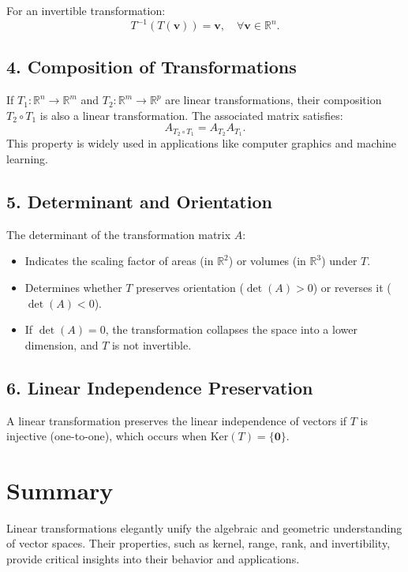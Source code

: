\documentclass[11pt]{article}
\begin{document}
For an invertible transformation:
\[
T^{-1}(T(\mathbf{v})) = \mathbf{v}, \quad \forall \mathbf{v} \in \mathbb{R}^n.
\]

\subsection*{4. Composition of Transformations}

If \( T_1: \mathbb{R}^n \to \mathbb{R}^m \) and \( T_2: \mathbb{R}^m \to \mathbb{R}^p \) are linear transformations, their composition \( T_2 \circ T_1 \) is also a linear transformation. The associated matrix satisfies:
\[
A_{T_2 \circ T_1} = A_{T_2} A_{T_1}.
\]
This property is widely used in applications like computer graphics and machine learning.

\subsection*{5. Determinant and Orientation}

The determinant of the transformation matrix \( A \):
\begin{itemize}
    \item Indicates the scaling factor of areas (in \( \mathbb{R}^2 \)) or volumes (in \( \mathbb{R}^3 \)) under \( T \).
    \item Determines whether \( T \) preserves orientation (\( \det(A) > 0 \)) or reverses it (\( \det(A) < 0 \)).
    \item If \( \det(A) = 0 \), the transformation collapses the space into a lower dimension, and \( T \) is not invertible.
\end{itemize}

\subsection*{6. Linear Independence Preservation}

A linear transformation preserves the linear independence of vectors if \( T \) is injective (one-to-one), which occurs when \( \text{Ker}(T) = \{\mathbf{0}\} \).

\section*{Summary}

Linear transformations elegantly unify the algebraic and geometric understanding of vector spaces. Their properties, such as kernel, range, rank, and invertibility, provide critical insights into their behavior and applications.
\end{document}
